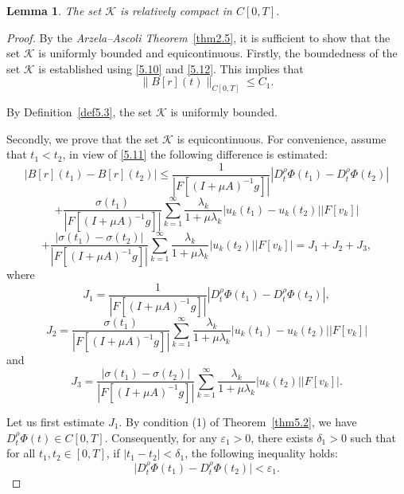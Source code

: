 \documentclass[reqno]{amsart}
\newtheorem{lem}[thm]{Lemma}
\theoremstyle{definition}
\numberwithin{equation}{section}
\begin{document}
\begin{lem} \label{lem5.5} The set $\mathcal{K}$ is relatively compact in $C[0,T]$.
\end{lem}
\begin{proof} By the \textit{Arzela–Ascoli Theorem}~\ref{thm2.5}, it is sufficient to show that the set $\mathcal{K}$ is uniformly bounded and equicontinuous. Firstly, the boundedness of the set $\mathcal{K}$ is established using \eqref{5.10} and \eqref{5.12}. This implies that
$$
\|B[r](t)\|_{C[0,T]} \leq C_1.
$$

By Definition~\ref{def5.3}, the set $\mathcal{K}$ is uniformly bounded.

Secondly, we prove that the set $\mathcal{K}$ is equicontinuous. For convenience, assume that $t_1<t_2$, in view of \eqref{5.11} the following difference is estimated:
$$
\left| B[r]\left( {{t}_{1}} \right)-B[r]\left( {{t}_{2}} \right) \right|\le \frac{1}{\left| F[{{(I+\mu A)}^{-1}}g] \right|}\left| D_{t}^{\rho }\Phi \left( {{t}_{1}} \right)-D_{t}^{\rho }\Phi \left( {{t}_{2}} \right) \right|
$$
$$
+\frac{\sigma \left( {{t}_{1}} \right)}{\left| F[{{(I+\mu A)}^{-1}}g] \right|}\sum\limits_{k=1}^{\infty }{\frac{{{\lambda }_{k}}}{1+\mu {{\lambda }_{k}}}}\left| {{u}_{k}}\left( {{t}_{1}} \right)-{{u}_{k}}\left( {{t}_{2}} \right) \right|\left| F\left[ {{v}_{k}} \right] \right|
$$
$$
+\frac{\left| \sigma \left( {{t}_{1}} \right)-\sigma \left( {{t}_{2}} \right) \right|}{\left| F[{{(I+\mu A)}^{-1}}g] \right|}\sum\limits_{k=1}^{\infty }{\frac{{{\lambda }_{k}}}{1+\mu {{\lambda }_{k}}}}\left| {{u}_{k}}\left( {{t}_{2}} \right) \right|\left| F\left[ {{v}_{k}} \right] \right|={{J}_{1}}+{{J}_{2}}+{{J}_{3}},
$$
where 
$$
J_1 =  \frac{1}{\left| F[{{(I+\mu A)}^{-1}}g] \right|}\left| D_{t}^{\rho }\Phi \left( {{t}_{1}} \right)-D_{t}^{\rho }\Phi \left( {{t}_{2}} \right) \right|,
$$
$$
J_2 = \frac{\sigma \left( {{t}_{1}} \right)}{\left| F[{{(I+\mu A)}^{-1}}g] \right|}\sum\limits_{k=1}^{\infty }{\frac{{{\lambda }_{k}}}{1+\mu {{\lambda }_{k}}}}\left| {{u}_{k}}\left( {{t}_{1}} \right)-{{u}_{k}}\left( {{t}_{2}} \right) \right|\left| F\left[ {{v}_{k}} \right] \right|
$$
and
$$
J_3 = \frac{\left| \sigma \left( {{t}_{1}} \right)-\sigma \left( {{t}_{2}} \right) \right|}{\left| F[{{(I+\mu A)}^{-1}}g] \right|}\sum\limits_{k=1}^{\infty }{\frac{{{\lambda }_{k}}}{1+\mu {{\lambda }_{k}}}}\left| {{u}_{k}}\left( {{t}_{2}} \right) \right|\left| F\left[ {{v}_{k}} \right] \right|.
$$

Let us first estimate $J_1$. By condition (1) of Theorem~\ref{thm5.2}, we have $D_t^{\rho}\Phi(t) \in C[0,T]$. Consequently, for any $\varepsilon_1>0$, there exists $\delta_1>0$ such that for all $t_1, t_2 \in [0,T]$, if $|t_1 - t_2| < \delta_1$, the following inequality holds:
$$
\big|D_t^{\rho}\Phi(t_1) - D_t^{\rho}\Phi(t_2)\big| < \varepsilon_1.
$$


\end{proof}
\end{document}

